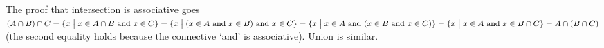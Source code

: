 \documentclass{ibl}  %
\begin{document}
\begin{problem}
\begin{answer}
\begin{items}
  The proof that intersection is associative goes
  $(A\cap B)\cap C=
    \{x \bigm| \text{$x\in A\cap B$ and $x\in C$}\}
    =
    \{x \bigm| \text{($x\in A$ and $x\in B$) and $x\in C$}\}
    =
    \{x \bigm| \text{$x\in A$ and ($x\in B$ and $x\in C$)}\}
   =
    \{x \bigm| \text{$x\in A$ and $x\in B\cap C$}\}
   =
   A\cap (B\cap C)$
   (the second equality holds because the connective `and' is associative).
   Union is similar.
\end{items}
\end{answer}
\end{problem}



\end{document}
